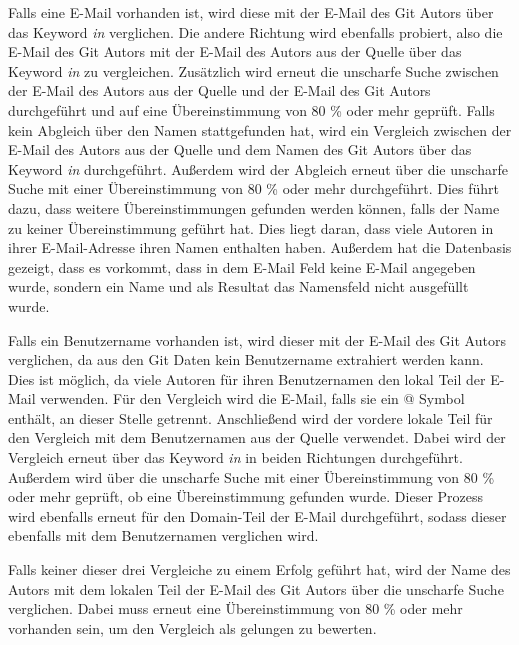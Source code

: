 Falls eine E-Mail vorhanden ist, wird diese mit der E-Mail des Git Autors über das Keyword \emph{in} verglichen.
Die andere Richtung wird ebenfalls probiert, also die E-Mail des Git Autors mit der E-Mail des Autors aus der Quelle über das Keyword \emph{in} zu vergleichen.
Zusätzlich wird erneut die unscharfe Suche zwischen der E-Mail des Autors aus der Quelle und der E-Mail des Git Autors durchgeführt und auf eine Übereinstimmung von 80 \% oder mehr geprüft.
Falls kein Abgleich über den Namen stattgefunden hat, wird ein Vergleich zwischen der E-Mail des Autors aus der Quelle und dem Namen des Git Autors über das Keyword \emph{in} durchgeführt.
Außerdem wird der Abgleich erneut über die unscharfe Suche mit einer Übereinstimmung von 80 \% oder mehr durchgeführt.
Dies führt dazu, dass weitere Übereinstimmungen gefunden werden können, falls der Name zu keiner Übereinstimmung geführt hat.
Dies liegt daran, dass viele Autoren in ihrer E-Mail-Adresse ihren Namen enthalten haben.
Außerdem hat die Datenbasis gezeigt, dass es vorkommt, dass in dem E-Mail Feld keine E-Mail angegeben wurde, sondern ein Name und als Resultat das Namensfeld nicht ausgefüllt wurde.

Falls ein Benutzername vorhanden ist, wird dieser mit der E-Mail des Git Autors verglichen, da aus den Git Daten kein Benutzername extrahiert werden kann.
Dies ist möglich, da viele Autoren für ihren Benutzernamen den lokal Teil der E-Mail verwenden.
Für den Vergleich wird die E-Mail, falls sie ein @ Symbol enthält, an dieser Stelle getrennt.
Anschließend wird der vordere lokale Teil für den Vergleich mit dem Benutzernamen aus der Quelle verwendet.
Dabei wird der Vergleich erneut über das Keyword \emph{in} in beiden Richtungen durchgeführt.
Außerdem wird über die unscharfe Suche mit einer Übereinstimmung von 80 \% oder mehr geprüft, ob eine Übereinstimmung gefunden wurde.
Dieser Prozess wird ebenfalls erneut für den Domain-Teil der E-Mail durchgeführt, sodass dieser ebenfalls mit dem Benutzernamen verglichen wird.

Falls keiner dieser drei Vergleiche zu einem Erfolg geführt hat, wird der Name des Autors mit dem lokalen Teil der E-Mail des Git Autors über die unscharfe Suche verglichen.
Dabei muss erneut eine Übereinstimmung von 80 \% oder mehr vorhanden sein, um den Vergleich als gelungen zu bewerten.

